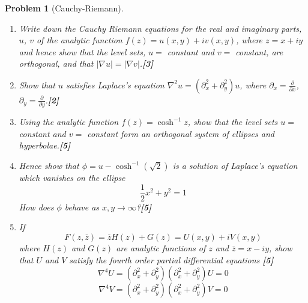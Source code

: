 \documentclass[a4paper]{article}
\theoremstyle{new}
\newtheorem{qns}{Problem}[section]
\begin{document}
\begin{qns}[Cauchy-Riemann]\leavevmode
\begin{enumerate}[label=(\roman*)]
\item Write down the Cauchy Riemann equations for the real and imaginary parts, $u$, $v$ of the analytic function $f(z) = u(x, y)+iv(x, y)$, where $z = x+iy$ and hence show that the level sets, $u =$ constant and $v =$ constant, are orthogonal, and that $|\nabla u| = |\nabla v|$.\hfill \textbf{[3]}
\item Show that $u$ satisfies Laplace’s equation $\nabla^2 u=(\partial_x^2+\partial_y^2)u$, where $\partial_x=\frac{\partial}{\partial x}$, $\partial_y=\frac{\partial}{\partial y}$.\hfill \textbf{[2]}
\item Using the analytic function $f(z) = \cosh^{−1} z$, show that the level sets $u =$ constant and $v =$ constant form an orthogonal system of ellipses and hyperbolae.\hfill \textbf{[5]}
\item Hence show that $\phi=u-\cosh^{-1}(\sqrt{2})$ is a solution of Laplace’s equation which vanishes on the ellipse
$$\frac{1}{2}x^2+y^2=1$$
How does $\phi$ behave as $x,y\rightarrow\infty$?\hfill \textbf{[5]}
\item If $$F(z,\overline{z})=\overline{z}H(z)+G(z)=U(x,y)+iV(x,y)$$
where $H(z)$ and $G(z)$ are analytic functions of $z$ and $\overline{z}=x-iy$, show that $U$ and $V$ satisfy the fourth order partial differential equations \hfill \textbf{[5]}
$$\nabla^4U=(\partial_x^2+\partial_y^2)(\partial_x^2+\partial_y^2)U=0$$
$$\nabla^4V=(\partial_x^2+\partial_y^2)(\partial_x^2+\partial_y^2)V=0$$
\end{enumerate}
\end{qns}
\end{document}
